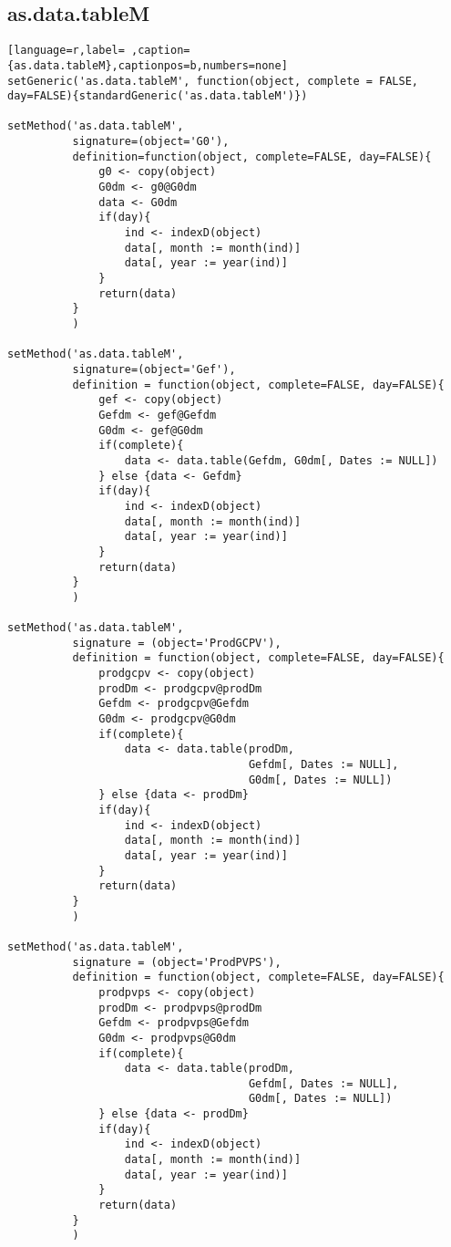 \subsection{as.data.tableM}
\label{sec:org50525a0}
\label{subsec:as.data.tablem}
\begin{lstlisting}[language=r,label= ,caption={as.data.tableM},captionpos=b,numbers=none]
setGeneric('as.data.tableM', function(object, complete = FALSE, day=FALSE){standardGeneric('as.data.tableM')})

setMethod('as.data.tableM',
          signature=(object='G0'),
          definition=function(object, complete=FALSE, day=FALSE){
              g0 <- copy(object)
              G0dm <- g0@G0dm
              data <- G0dm
              if(day){
                  ind <- indexD(object)
                  data[, month := month(ind)]
                  data[, year := year(ind)]
              }
              return(data)
          }
          )

setMethod('as.data.tableM',
          signature=(object='Gef'),
          definition = function(object, complete=FALSE, day=FALSE){
              gef <- copy(object)
              Gefdm <- gef@Gefdm
              G0dm <- gef@G0dm
              if(complete){
                  data <- data.table(Gefdm, G0dm[, Dates := NULL])
              } else {data <- Gefdm}
              if(day){
                  ind <- indexD(object)
                  data[, month := month(ind)]
                  data[, year := year(ind)]
              }
              return(data)
          }
          )

setMethod('as.data.tableM',
          signature = (object='ProdGCPV'),
          definition = function(object, complete=FALSE, day=FALSE){
              prodgcpv <- copy(object)
              prodDm <- prodgcpv@prodDm
              Gefdm <- prodgcpv@Gefdm
              G0dm <- prodgcpv@G0dm
              if(complete){
                  data <- data.table(prodDm,
                                     Gefdm[, Dates := NULL],
                                     G0dm[, Dates := NULL])
              } else {data <- prodDm}
              if(day){
                  ind <- indexD(object)
                  data[, month := month(ind)]
                  data[, year := year(ind)]
              }
              return(data)
          }
          )

setMethod('as.data.tableM',
          signature = (object='ProdPVPS'),
          definition = function(object, complete=FALSE, day=FALSE){
              prodpvps <- copy(object)
              prodDm <- prodpvps@prodDm
              Gefdm <- prodpvps@Gefdm
              G0dm <- prodpvps@G0dm
              if(complete){
                  data <- data.table(prodDm,
                                     Gefdm[, Dates := NULL],
                                     G0dm[, Dates := NULL])
              } else {data <- prodDm}
              if(day){
                  ind <- indexD(object)
                  data[, month := month(ind)]
                  data[, year := year(ind)]
              }
              return(data)
          }
          )
\end{lstlisting}
